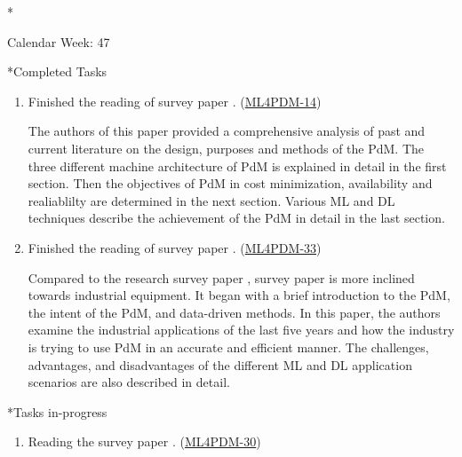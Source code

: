 \documentclass[11pt,a4paper]{article}
\begin{document}
\newpage
\begin{section}*{Calendar Week: 47 \hfill \date{20 November, 2020}}
 \begin{refsection}
     \begin{subsection}*{Completed Tasks}
         \begin{enumerate}
             \item
                   Finished the reading of survey paper \cite{DBLP:journals/corr/abs-1912-07383}. (\href{https://ml4pdm.atlassian.net/browse/ML4PDM-14}{ML4PDM-14})
                   \par The authors of this paper provided a comprehensive analysis of past and current literature on the design, purposes and methods of the PdM. The three different machine architecture of PdM is explained in detail in the first section. Then the objectives of PdM in cost minimization, availability and realiablilty are determined in the next section. Various ML and DL techniques describe the achievement of the PdM in detail in the last section.
             \item
                   Finished the reading of survey paper \cite{DBLP:journals/sj/ZhangYW19}. (\href{https://ml4pdm.atlassian.net/browse/ML4PDM-33}{ML4PDM-33})
                   \par Compared to the research survey paper \cite{DBLP:journals/corr/abs-1912-07383}, survey paper \cite{DBLP:journals/sj/ZhangYW19} is more inclined towards industrial equipment. It began with a brief introduction to the PdM, the intent of the PdM, and data-driven methods. In this paper, the authors examine the industrial applications of the last five years and how the industry is trying to use PdM in an accurate and efficient manner. The challenges, advantages, and disadvantages of the different ML and DL application scenarios are also described in detail.
         \end{enumerate}
     \end{subsection}

     \begin{subsection}*{Tasks in-progress}
         \begin{enumerate}
             \item
                   Reading the survey paper \cite{DBLP:journals/candie/CarvalhoSVFBA19}. (\href{https://ml4pdm.atlassian.net/browse/ML4PDM-30}{ML4PDM-30})
         \end{enumerate}
     \end{subsection}

     \printbibliography
 \end{refsection}
\end{section}
\end{document}
